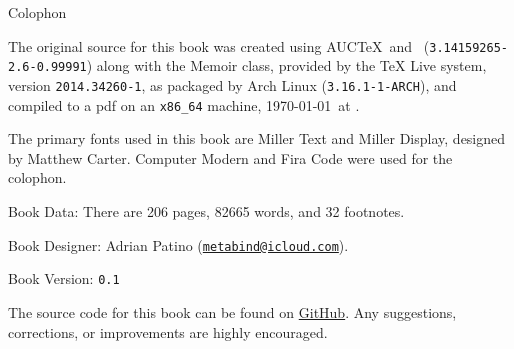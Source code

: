 
\cleartoverso{}
\pagestyle{empty}

\newlength{\colophon}
\calccentering{\colophon}
\begin{adjustwidth*}{\colophon}{\colophon}

\begin{flushleft}
\setlength{\parskip}{1.5\baselineskip}
{\large Colophon}

The original source for this book was created using AUC\TeX\ and
\XeLaTeX\ (\texttt{3.14159265-2.6-0.99991}) along with the Memoir
class, provided by the \TeX{} Live system, version
\texttt{2014.34260-1}, as packaged by Arch Linux
(\texttt{3.16.1-1-ARCH}), and compiled to a pdf on an
\texttt{x86\_64} machine, \today\ at \printtime*.

The primary fonts used in this book are Miller Text and Miller
Display, designed by Matthew Carter.  Computer Modern and Fira Code
were used for the colophon.

Book Data: There are 206 pages, 82665 words, and 32 footnotes. 

Book Designer: Adrian Patino
(\href{mailto:metabind@icloud.com}{\texttt{metabind@icloud.com}}).

Book Version: \texttt{0.1}

The source code for this book can be found on
\href{https://github.com/metabind/spirit-hazlitt}{GitHub}.  Any
suggestions, corrections, or improvements are highly encouraged.


\end{flushleft}
\end{adjustwidth*}

